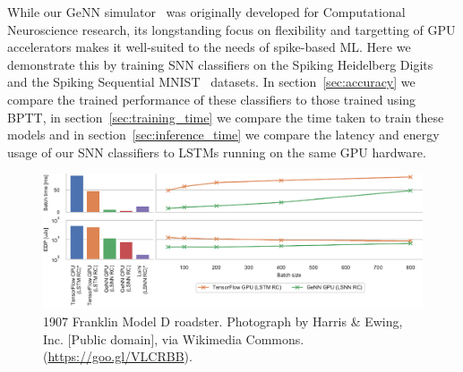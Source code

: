 \documentclass[sigconf,authordraft]{acmart}
\newcommand{\todo}[1]{\textbf{\textsc{\textcolor{red}{(TODO: #1)}}}}
\begin{document}
While our GeNN simulator~\citep{Yavuz2016,Knight2018,Knight2021} was originally developed for Computational Neuroscience research, its longstanding focus on flexibility and targetting of GPU accelerators makes it well-suited to the needs of spike-based ML.
Here we demonstrate this by training SNN classifiers on the Spiking Heidelberg Digits~\citep{Cramer2020} and the Spiking Sequential MNIST~\citep{Plank2021} datasets.
In section~\ref{sec:accuracy} we compare the trained performance of these classifiers to those trained using BPTT, in section~\ref{sec:training_time} we compare the time taken to train these models and in section~\ref{sec:inference_time} we compare the latency and energy usage of our SNN classifiers to LSTMs running on the same GPU hardware.


\begin{figure}[t]
  \centering
  \includegraphics{figures/lstm_vs_genn.pdf}
  \caption{1907 Franklin Model D roadster. Photograph by Harris \&
    Ewing, Inc. [Public domain], via Wikimedia
    Commons. (\url{https://goo.gl/VLCRBB}).}
  \label{fig:lstm_vs_genn}
\end{figure}
\end{document}
